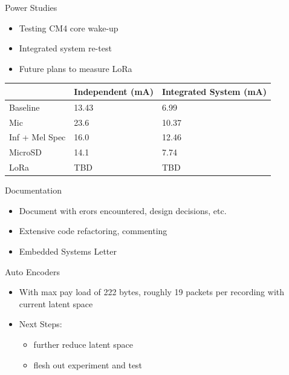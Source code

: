 \begin{frame}{Power Studies}
    \begin{itemize}
        \item Testing CM4 core wake-up
        \item Integrated system re-test
        \item Future plans to measure LoRa
    \end{itemize}
    \begin{table}[]
    \begin{tabular}{lll}
    \hline
                & Independent (mA) & Integrated System (mA) \\ \hline
    Baseline       & 13.43            & 6.99                  \\
    Mic            & 23.6             & 10.37                 \\
    Inf + Mel Spec & 16.0             & 12.46                 \\
    MicroSD        & 14.1             & 7.74                  \\
    LoRa          & TBD              & TBD                     \\ \hline
    \end{tabular}
    \end{table}
\end{frame}

\begin{frame}{Documentation}
    \begin{itemize}
        \item Document with erors encountered, design decisions, etc.
        \item Extensive code refactoring, commenting
        \item Embedded Systems Letter
    \end{itemize}
\end{frame}

\begin{frame}{Auto Encoders}
    \begin{itemize}
        \item With max pay load of 222 bytes, roughly 19 packets per recording with current latent space
        \item Next Steps:
        \begin{itemize}
            \item further reduce latent space 
            \item flesh out experiment and test
        \end{itemize}
    \end{itemize}
\end{frame}




